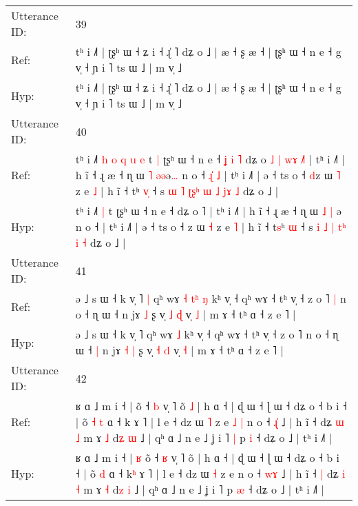 \documentclass[10pt]{article}
\DeclareRobustCommand{\hl}[1]{{\textcolor{red}{#1}}}
\begin{document}
\begin{longtable}{ll}
Utterance ID: & 39 \\
Ref: & tʰ i ˩˥ | ʈʂʰ ɯ ˧ ʑ i ˧ ɻ̍ ˥ dʑ o ˩ | æ ˧ ʂ æ ˧ | ʈʂʰ ɯ ˧ n e ˧ g v̩ ˧ ɲ i ˥ ts ɯ ˩ | m v̩ ˩
 \\
Hyp: & tʰ i ˩˥ | ʈʂʰ ɯ ˧ ʑ i ˧ ɻ̍ ˥ dʑ o ˩ | æ ˧ ʂ æ ˧ | ʈʂʰ ɯ ˧ n e ˧ g v̩ ˧ ɲ i ˥ ts ɯ ˩ | m v̩ ˩
 \\
\midrule
Utterance ID: & 40 \\
Ref: & tʰ i ˩˥\hl{ }\hl{h}\hl{ }\hl{o}\hl{ }\hl{q}\hl{ }\hl{u} \hl{e} t\hl{ }\hl{|} ʈʂʰ ɯ ˧ n e ˧\hl{ }\hl{ʝ}\hl{ }\hl{i}\hl{ }\hl{˥} dʑ o\hl{ }\hl{˩}\hl{ }\hl{|}\hl{ }\hl{w}\hl{ɤ} \hl{˩}˥ | tʰ i ˩˥ | h ĩ ˧ ɻ æ ˧ ɳ ɯ \hl{˥} \hl{ə}\hl{ə}ə\hl{…} n o ˧\hl{ }\hl{ɻ}\hl{̍}\hl{ }\hl{˩} | tʰ i ˩˥ | ə ˧ ts o ˧ \hl{d}z ɯ \hl{˥} z e \hl{˩} | h ĩ ˧ t\hl{}ʰ \hl{v}\hl{̩} ˧ s \hl{ɯ} \hl{˥} \hl{ʈ}\hl{ʂ}\hl{ʰ} \hl{ɯ}\hl{ }\hl{˩} \hl{j}\hl{ɤ} \hl{˩} dʑ o ˩ |
 \\
Hyp: & tʰ i ˩˥\hl{}\hl{}\hl{}\hl{}\hl{}\hl{}\hl{}\hl{} \hl{|} t\hl{}\hl{} ʈʂʰ ɯ ˧ n e ˧\hl{}\hl{}\hl{}\hl{}\hl{}\hl{} dʑ o\hl{}\hl{}\hl{}\hl{}\hl{}\hl{}\hl{} \hl{}˥ | tʰ i ˩˥ | h ĩ ˧ ɻ æ ˧ ɳ ɯ \hl{˩} \hl{|}\hl{ }ə\hl{} n o ˧\hl{}\hl{}\hl{}\hl{}\hl{} | tʰ i ˩˥ | ə ˧ ts o ˧ \hl{}z ɯ \hl{˧} z e \hl{˥} | h ĩ ˧ t\hl{s}ʰ \hl{}\hl{ɯ} ˧ s \hl{i} \hl{˩} \hl{}\hl{}\hl{|} \hl{}\hl{t}\hl{ʰ} \hl{}\hl{i} \hl{˧} dʑ o ˩ |
 \\
\midrule
Utterance ID: & 41 \\
Ref: & ə ˩ s ɯ ˧ k v̩ ˥\hl{ }\hl{|} qʰ wɤ\hl{ }\hl{˧}\hl{ }\hl{t}\hl{ʰ} \hl{ŋ} kʰ v̩ ˧ qʰ wɤ ˧ tʰ v̩ ˧ z o ˥\hl{ }\hl{|} n o ˧ ɳ ɯ ˧\hl{}\hl{} n jɤ\hl{}\hl{} \hl{˩} ʂ v̩ \hl{˩} \hl{ɖ} v̩ \hl{˩} | m ɤ ˧ tʰ ɑ ˧ z e ˥ |
 \\
Hyp: & ə ˩ s ɯ ˧ k v̩ ˥\hl{}\hl{} qʰ wɤ\hl{}\hl{}\hl{}\hl{}\hl{} \hl{˩} kʰ v̩ ˧ qʰ wɤ ˧ tʰ v̩ ˧ z o ˥\hl{}\hl{} n o ˧ ɳ ɯ ˧\hl{ }\hl{|} n jɤ\hl{ }\hl{˧} \hl{|} ʂ v̩ \hl{˧} \hl{d} v̩ \hl{˧} | m ɤ ˧ tʰ ɑ ˧ z e ˥ |
 \\
\midrule
Utterance ID: & 42 \\
Ref: & ʁ ɑ ˩ m i ˧ |\hl{}\hl{} õ ˧ \hl{b} v̩ ˥ õ\hl{ }\hl{˩} | h ɑ ˧ | ɖ ɯ ˧ ɭ ɯ ˧ dʑ o ˧ b i ˧ | õ\hl{ }\hl{˧} \hl{t} ɑ ˧ k\hl{} ɤ ˥ | l e ˧ dz ɯ \hl{˥} z e\hl{ }\hl{˩}\hl{ }\hl{|} n o ˧ \hl{ɻ}\hl{̍} ˩ | h ĩ ˧\hl{}\hl{} dʑ \hl{ɯ} \hl{˩} m ɤ \hl{˩} d\hl{ʑ} \hl{ɯ} ˩ | qʰ ɑ ˩ n e ˩ ʝ i ˥\hl{ }\hl{|} p \hl{i} ˧ dʑ o ˩ | tʰ i ˩˥ |
 \\
Hyp: & ʁ ɑ ˩ m i ˧ |\hl{ }\hl{ʁ} õ ˧ \hl{ʁ} v̩ ˥ õ\hl{}\hl{} | h ɑ ˧ | ɖ ɯ ˧ ɭ ɯ ˧ dʑ o ˧ b i ˧ | õ\hl{}\hl{} \hl{d} ɑ ˧ k\hl{ʰ} ɤ ˥ | l e ˧ dz ɯ \hl{˧} z e\hl{}\hl{}\hl{}\hl{} n o ˧ \hl{w}\hl{ɤ} ˩ | h ĩ ˧\hl{ }\hl{|} dʑ \hl{i} \hl{˧} m ɤ \hl{˧} d\hl{z} \hl{i} ˩ | qʰ ɑ ˩ n e ˩ ʝ i ˥\hl{}\hl{} p \hl{æ} ˧ dʑ o ˩ | tʰ i ˩˥ |

\end{longtable}
\end{document}
